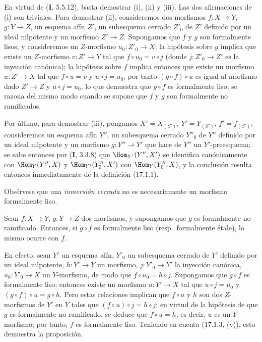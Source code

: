 En virtud de (\textbf I, 5.5.12), basta demostrar (i), (ii) y (iii). Las dos afirmaciones de (i) son triviales. Para demostrar (ii), consideremos dos morfismos $f:X\to Y$, $g:Y\to Z$, un esquema afín $Z'$, un subesquema cerrado $Z'_0$ de $Z'$ definido por un ideal nilpotente y un morfismo $Z'\to Z$. Supongamos que $f$ y $g$ son formalmente lisos, y consideremos un
$Z$-morfismo $u_0:Z'_0\to X$; la hipótesis sobre $g$ implica que existe un $Z$-morfismo $v:Z'\to Y$ tal que $f\circ u_0=v\circ j$ (donde $j:Z'_0\to Z'$ es la inyección canónica); la hipótesis sobre $f$ implica entonces que existe un morfismo $u:Z'\to X$ tal que $f\circ u=v$ y $u\circ j=u_0$, por tanto $(g\circ f)\circ u$ es igual al morfismo dado $Z'\to Z$ y $u\circ j=u_0$, lo que demuestra que $g\circ f$ es formalmente liso; se razona del mismo modo cuando se supone que $f$ y $g$ son formalmente no ramificados.

Por último, para demostrar (iii), pongamos $X'=X_{(S')}$, $Y'=Y_{(S')}$, $f'=f_{(S')}$; consideremos un esquema afín $Y''$, un subesquema cerrado $Y''_0$ de $Y''$ definido por un ideal nilpotente y un morfismo $g:Y''\to Y'$ que hace de $Y''$ un $Y'$-preesquema; se sabe entonces por (\textbf I, 3.3.8) que $\Hom_{Y'}(Y'',X')$ se identifica canónicamente con $\Hom_Y(Y'',X)$ y $\Hom_{Y'}(Y''_0,X')$ con $\Hom_Y(Y''_0,X)$, y la conclusión resulta entonces inmediatamente de la definición (17.1.1).

Obsérvese que una \emph{inmersión cerrada} no es necesariamente un morfismo formalmente liso.

\begin{proposition}[17.1.4]
\label{IV.17.1.4}
Sean $f:X\to Y$, $g:Y\to Z$ dos morfismos, y supongamos que $g$ es formalmente no ramificado. Entonces, si $g\circ f$ es formalmente liso \textup{(resp.}\ formalmente étale\textup{)}, lo mismo ocurre con $f$.
\end{proposition}

En efecto, sean $Y'$ un esquema afín, $Y'_0$ un subesquema cerrado de $Y'$ definido por un ideal nilpotente, $h:Y'\to Y$ un morfismo, $j:Y'_0\to Y'$ la inyección canónica, $u_0:Y'_0\to X$ un $Y$-morfismo, de modo que $f\circ u_0=h\circ j$. Supongamos que $g\circ f$ es formalmente liso; entonces existe un morfismo $u:Y'\to X$ tal que $u\circ j=u_0$ y $(g\circ f)\circ u=g\circ h$. Pero estas relaciones implican que $f\circ u$ y $h$ son dos $Z$-morfismos de $Y'$ en $Y$ tales que $(f\circ u)\circ j=h\circ j$; en virtud de la hipótesis de que $g$ es formalmente no ramificado, se deduce que $f\circ u=h$, es decir, $u$ es un $Y$-morfismo; por tanto, $f$ es formalmente liso. Teniendo en cuenta (17.1.3, (v)), esto demuestra la proposición.

